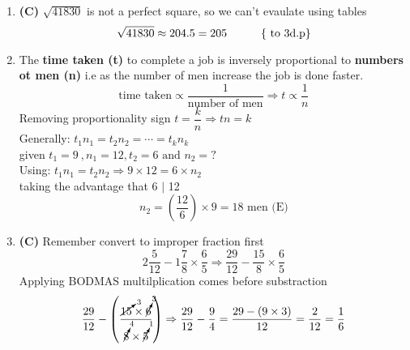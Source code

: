 \begin{multicols}{2}
\begin{enumerate}[label={\arabic*.}]
    \item \textbf{(C) } $ \sqrt{41830}$ is not a perfect square, so we can't evaulate using tables
    \[ \sqrt{41830} \approx 204.5 = 205 \hspace{30px} \text{\{ to 3d.p\}}\]
    \item The \textbf{time taken (t)} to complete a job is inversely proportional to \textbf{numbers ot men (n)} 
    i.e as the number of men increase the job is done faster. 
        \begin{equation}
            \text{time taken} \propto \dfrac{1}{\text{number of men}} \Rightarrow t \propto \dfrac{1}{n} 
        \end{equation}
    Removing proportionality sign
    \(t = \dfrac{k}{n} \Rightarrow tn = k\) \\
    Generally:  \hspace{10px}\(t_{1}n_{1} = t_{2}n_2 = \cdots = t_{k}n_{k}\)\\
    given \(t_{1} = 9\ , n_{1} = 12 , t_{2} = 6 \text{ and } n_{2} = ?\) \\
    Using: \(t_{1}n_{1} = t_{2}n_{2} \Rightarrow 9 \times 12 = 6 \times n_{2}\) \\
    taking the advantage that 6 $\mid$ 12 
    \[n_{2} = \left(\frac{12}{6}\right) \times 9 = 18 \text { men (E)}\]

    \item \textbf{(C)} Remember convert to improper fraction first
    \[2\frac{5}{12} - 1\frac{7}{8} \times \frac{6}{5} \Rightarrow \frac{29}{12} - \frac{15}{8} \times \frac{6}{5}\]
    Applying BODMAS multilplication comes before substraction\\
    \[\dfrac{29}{12} - \left(\dfrac{\cancelto{3}{15} \times \cancelto{3}{6}}{\cancelto{4}{8} \times \cancelto{1}{5}}\right) \Rightarrow \dfrac{29}{12} - \dfrac{9}{4} = \dfrac{29 - (9 \times 3)}{12} = \frac{2}{12} = \frac{1}{6}\]


\end{enumerate}
\end{multicols}
